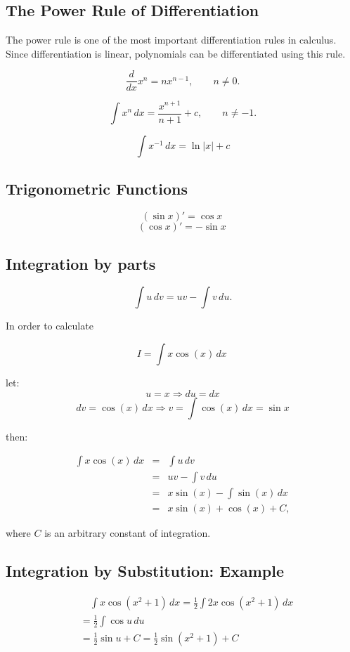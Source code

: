 \documentclass[12pt, a4paper]{article}
\begin{document}
\author{Kevin O'Brien}
\tableofcontents
\subsection*{The Power Rule of Differentiation}
The power rule is one of the most important differentiation rules in calculus. Since differentiation is linear, polynomials can be differentiated using this rule.

\[ \frac{d}{dx} x^n = nx^{n-1} , \qquad n \neq 0.\]

\[\int\! x^n \,dx= \frac{ x^{n+1}}{n+1} + c, \qquad n \neq -1.\]

\[\int \! x^{-1}\, dx= \ln |x|+ c\]

\subsection*{Trigonometric Functions}

\[ (\sin x)' = \cos x \,\]
\[ (\cos x)' = -\sin x \, \]


\subsection*{Integration by parts}

\[ \int u \, dv=uv-\int v \, du. \]


In order to calculate

\[I=\int x\cos (x) \,dx\,\]

let:
\[u = x \Rightarrow d u = dx\]
\[dv = \cos(x)\,dx \Rightarrow v = \int\cos(x)\,dx = \sin x\]

then:

\begin{eqnarray*}
  \int x\cos (x) \,dx & =& \int u \, dv \\
  & = & uv - \int v \, du \\
  & = & x\sin (x) - \int \sin (x) \,dx \\
  & = & x\sin (x) + \cos (x) + C,
\end{eqnarray*}


where $C$ is an arbitrary constant of integration.

\subsection*{Integration by Substitution: Example}

\begin{eqnarray*}
& {} \quad \int x \cos(x^2+1) \,dx = \frac{1}{2} \int 2x \cos(x^2+1) \,dx \\
& {} = \frac{1}{2} \int\cos u\,du \\ & { }= \frac{1}{2}\sin u + C = \frac{1}{2}\sin(x^2+1) + C
\end{eqnarray*}
\end{document}
